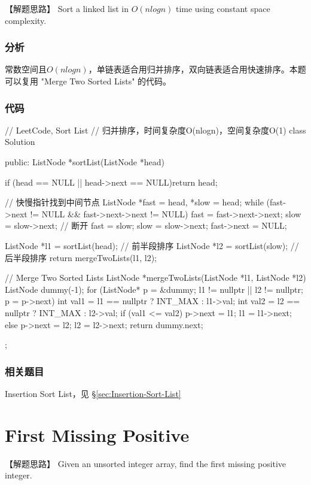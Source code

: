【解题思路】
Sort a linked list in $O(n log n)$ time using constant space complexity.


\subsubsection{分析}
常数空间且$O(nlogn)$，单链表适合用归并排序，双向链表适合用快速排序。本题可以复用 "Merge Two Sorted Lists" 的代码。


\subsubsection{代码}
\begin{Code}
	// LeetCode, Sort List
	// 归并排序，时间复杂度O(nlogn)，空间复杂度O(1)
	class Solution {
		public:
		ListNode *sortList(ListNode *head) {
			if (head == NULL || head->next == NULL)return head;
			
			// 快慢指针找到中间节点
			ListNode *fast = head, *slow = head;
			while (fast->next != NULL && fast->next->next != NULL) {
				fast = fast->next->next;
				slow = slow->next;
			}
			// 断开
			fast = slow;
			slow = slow->next;
			fast->next = NULL;
			
			ListNode *l1 = sortList(head);  // 前半段排序
			ListNode *l2 = sortList(slow);  // 后半段排序
			return mergeTwoLists(l1, l2);
		}
		
		// Merge Two Sorted Lists
		ListNode *mergeTwoLists(ListNode *l1, ListNode *l2) {
			ListNode dummy(-1);
			for (ListNode* p = &dummy; l1 != nullptr || l2 != nullptr; p = p->next) {
				int val1 = l1 == nullptr ? INT_MAX : l1->val;
				int val2 = l2 == nullptr ? INT_MAX : l2->val;
				if (val1 <= val2) {
					p->next = l1;
					l1 = l1->next;
				} else {
				p->next = l2;
				l2 = l2->next;
			}
		}
		return dummy.next;
	}
};
\end{Code}


\subsubsection{相关题目}
\begindot
\item Insertion Sort List，见 \S \ref{sec:Insertion-Sort-List}
\myenddot


\section{First Missing Positive} %
\label{sec:first-missing-positive}


【解题思路】
Given an unsorted integer array, find the first missing positive integer.

